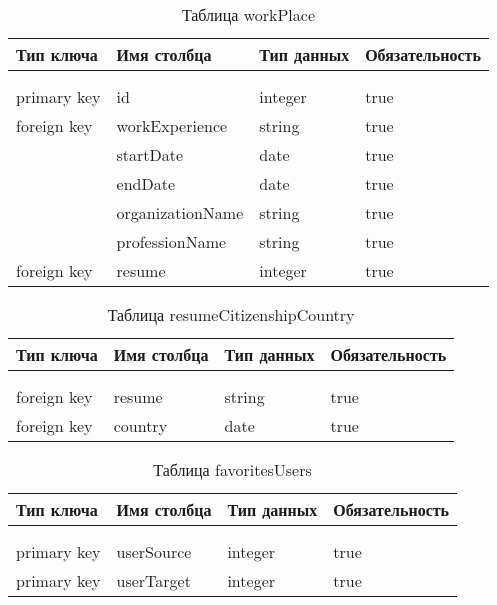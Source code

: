 \begin{xltabular}{\textwidth}{|l|l|p{1.7cm}|X|}
	\caption{Таблица workPlace \label{workPlace:table}}\\ \hline
	\centrow Тип ключа & \centrow Имя столбца & \centrow Тип
	данных & \centrow Обязательность \\ \hline
	 &  &  &  \\ \hline
	\endfirsthead
	 &  &  &  \\ \hline
	\finishhead
	primary key & id & integer & true \\ \hline 
	foreign key	& workExperience & string & true \\ \hline 
	& startDate & date & true \\ \hline 
	& endDate & date & true \\ \hline 
	& organizationName & string & true \\ \hline 
	& professionName & string & true \\ \hline 
	foreign key	& resume & integer & true \\ \hline 
\end{xltabular}

\begin{xltabular}{\textwidth}{|l|l|p{1.7cm}|X|}
	\caption{Таблица resumeCitizenshipCountry \label{resumeCitizenshipCountry:table}}\\ \hline
	\centrow Тип ключа & \centrow Имя столбца & \centrow Тип
	данных & \centrow Обязательность \\ \hline
	 &  &  &  \\ \hline
	\endfirsthead
	 &  &  &  \\ \hline
	\finishhead
	foreign key	& resume & string & true \\ \hline 
	foreign key& country & date & true \\ \hline 
\end{xltabular}

\begin{xltabular}{\textwidth}{|l|l|p{1.7cm}|X|}
	\caption{Таблица favoritesUsers \label{favoritesUsers:table}}\\ \hline
	\centrow Тип ключа & \centrow Имя столбца & \centrow Тип данных & \centrow Обязательность \\ \hline
	 &  &  &  \\ \hline
	\endfirsthead
	 &  &  &  \\ \hline
	\finishhead
	primary key & userSource & integer & true \\ \hline 
	primary key & userTarget & integer & true \\ \hline
\end{xltabular}

